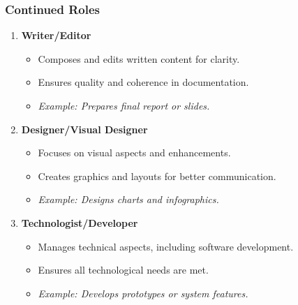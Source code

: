 \documentclass[aspectratio=169]{beamer}
\begin{document}
\begin{frame}[fragile]
    \frametitle{Continued Roles}
    \begin{enumerate}[resume]
        \item \textbf{Writer/Editor}
            \begin{itemize}
                \item Composes and edits written content for clarity.
                \item Ensures quality and coherence in documentation.
                \item \textit{Example: Prepares final report or slides.}
            \end{itemize}

        \item \textbf{Designer/Visual Designer}
            \begin{itemize}
                \item Focuses on visual aspects and enhancements.
                \item Creates graphics and layouts for better communication.
                \item \textit{Example: Designs charts and infographics.}
            \end{itemize}

        \item \textbf{Technologist/Developer}
            \begin{itemize}
                \item Manages technical aspects, including software development.
                \item Ensures all technological needs are met.
                \item \textit{Example: Develops prototypes or system features.}
            \end{itemize}
    \end{enumerate}
\end{frame}
\end{document}
